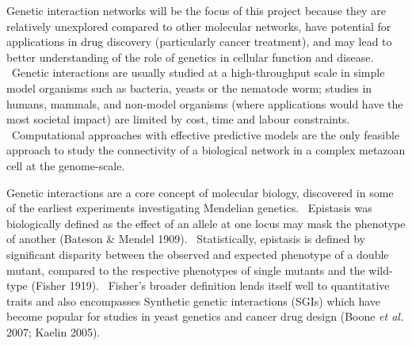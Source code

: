 Genetic interaction networks will be the focus of this project because
they are relatively unexplored compared to other molecular networks,
have potential for applications in drug discovery (particularly cancer
treatment), and may lead to better understanding of the role of
genetics in cellular function and disease. \ Genetic interactions are
usually studied at a high-throughput scale in simple model organisms
such as bacteria, yeasts or the nematode worm; studies in humans,
mammals, and non-model organisms (where applications would have the
most societal impact) are limited by cost, time and labour constraints.
\ Computational approaches with effective predictive models are the
only feasible approach to study the connectivity of a biological
network in a complex metazoan cell at the genome-scale.


Genetic interactions are a core concept of molecular biology, discovered
in some of the earliest experiments investigating Mendelian genetics.
\ Epistasis was biologically defined as the effect of an allele at one
locus may mask the phenotype of another (Bateson \& Mendel 1909).
\ Statistically, epistasis is defined by significant disparity between
the observed and expected phenotype of a double mutant, compared to the
respective phenotypes of single mutants and the wild-type (Fisher
1919). \ Fisher{\textquoteright}s broader definition lends itself well
to quantitative traits and also encompasses Synthetic genetic
interactions (SGIs) which have become popular for studies in yeast
genetics and cancer drug design (Boone\textit{ et al.} 2007; Kaelin
2005). \ 


